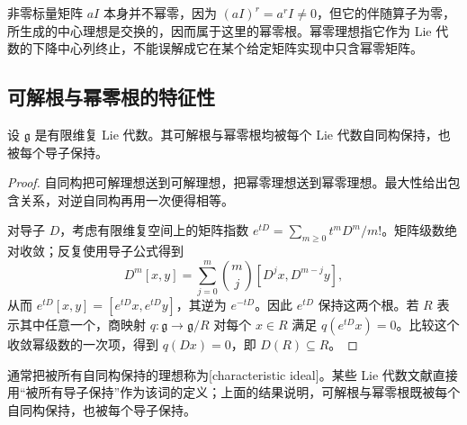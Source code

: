 非零标量矩阵 \(aI\) 本身并不幂零，因为 \((aI)^r=a^rI\ne0\)，但它的伴随算子为零，所生成的中心理想是交换的，因而属于这里的幂零根。幂零理想指它作为 Lie 代数的下降中心列终止，不能误解成它在某个给定矩阵实现中只含幂零矩阵。

\subsection{可解根与幂零根的特征性}
\label{b5:subsec:1203:02}

\begin{proposition}\label{b5:prop:lie-radicals-characteristic}
	设 \(\mathfrak g\) 是有限维复 Lie 代数。其可解根与幂零根均被每个 Lie 代数自同构保持，也被每个导子保持。
\end{proposition}
\begin{proof}
	自同构把可解理想送到可解理想，把幂零理想送到幂零理想。最大性给出包含关系，对逆自同构再用一次便得相等。

	对导子 \(D\)，考虑有限维复空间上的矩阵指数 \(e^{tD}=\sum_{m\ge0}t^mD^m/m!\)。矩阵级数绝对收敛；反复使用导子公式得到
	\[
		D^m[x,y]=\sum_{j=0}^{m}\binom mj[D^jx,D^{m-j}y],
	\]
	从而 \(e^{tD}[x,y]=[e^{tD}x,e^{tD}y]\)，其逆为 \(e^{-tD}\)。因此 \(e^{tD}\) 保持这两个根。若 \(R\) 表示其中任意一个，商映射 \(q:\mathfrak g\rightarrow\mathfrak g/R\) 对每个 \(x\in R\) 满足 \(q(e^{tD}x)=0\)。比较这个收敛幂级数的一次项，得到 \(q(Dx)=0\)，即 \(D(R)\subseteq R\)。
\end{proof}

通常把被所有自同构保持的理想称为[characteristic ideal]。某些 Lie 代数文献直接用“被所有导子保持”作为该词的定义；上面的结果说明，可解根与幂零根既被每个自同构保持，也被每个导子保持。

